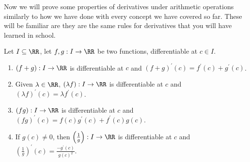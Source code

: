 \documentclass[../real_analysis.tex]{subfiles}
\begin{document}
        Now we will prove some properties of derivatives under arithmetic operations similarly to how we have done with every concept we have covered so far. These will be familiar are they are the same rules for derivatives that you will have learned in school.
        \begin{theorem}\label{diff-func-props}
            Let $I\subseteq\RR$, let $f,g:I\to\RR$ be two functions, differentiable at $c\in I$.
            \begin{enumerate}[label={\upshape(\roman*)}]
                \item $(f+g):I\to\RR$ is differentiable at $c$ and $(f+g)^\prime(c)=f^\prime(c)+g^\prime(c)$.
                \item Given $\lambda\in\RR$, $(\lambda f):I\to\RR$ is differentiable at $c$ and $(\lambda f)^\prime(c)=\lambda f^\prime(c)$.
                \item $(fg):I\to\RR$ is differentiable at $c$ and $(fg)^\prime(c)=f(c)g^\prime(c)+f^\prime(c)g(c)$.
                \item If $g(c)\neq0$, then $\left(\frac{1}{g}\right):I\to\RR$ is differentiable at $c$ and $\left(\frac{1}{g}\right)^\prime(c)=\frac{-g^\prime(c)}{g(c)^2}$.
            \end{enumerate}
        \end{theorem}
\end{document}

